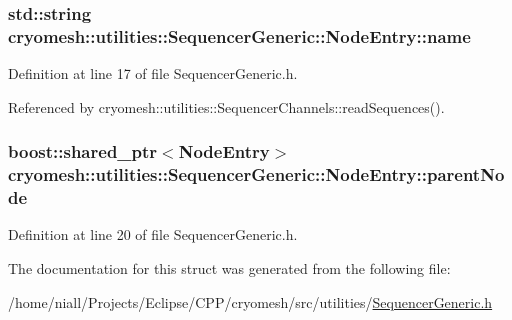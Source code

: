 \hypertarget{structcryomesh_1_1utilities_1_1SequencerGeneric_1_1NodeEntry_ac7bdacc33badb83a8599ac90a94b25aa}{
\subsubsection[{name}]{\setlength{\rightskip}{0pt plus 5cm}std\-::string {\bf cryomesh\-::utilities\-::\-Sequencer\-Generic\-::\-Node\-Entry\-::name}}}\label{structcryomesh_1_1utilities_1_1SequencerGeneric_1_1NodeEntry_ac7bdacc33badb83a8599ac90a94b25aa}


\-Definition at line 17 of file \-Sequencer\-Generic.\-h.



\-Referenced by cryomesh\-::utilities\-::\-Sequencer\-Channels\-::read\-Sequences().

\hypertarget{structcryomesh_1_1utilities_1_1SequencerGeneric_1_1NodeEntry_ad243d1b3137d6601cb413a43761ac073}{
\subsubsection[{parent\-Node}]{\setlength{\rightskip}{0pt plus 5cm}boost\-::shared\-\_\-ptr$<${\bf \-Node\-Entry}$>$ {\bf cryomesh\-::utilities\-::\-Sequencer\-Generic\-::\-Node\-Entry\-::parent\-Node}}}\label{structcryomesh_1_1utilities_1_1SequencerGeneric_1_1NodeEntry_ad243d1b3137d6601cb413a43761ac073}


\-Definition at line 20 of file \-Sequencer\-Generic.\-h.



\-The documentation for this struct was generated from the following file\-:\begin{DoxyCompactItemize}
\item 
/home/niall/\-Projects/\-Eclipse/\-C\-P\-P/cryomesh/src/utilities/\hyperlink{SequencerGeneric_8h}{\-Sequencer\-Generic.\-h}\end{DoxyCompactItemize}
